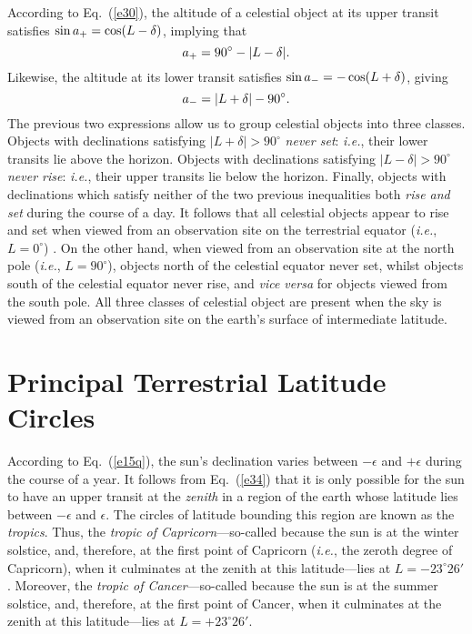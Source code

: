 According to Eq.~(\ref{e30}), the altitude of a celestial object at its upper
transit satisfies $\sin a_{\rm +} = \cos (L-\delta)$, implying that
\begin{equation}\label{e34}
a_{\rm +} = 90^\circ - |L-\delta|.
\end{equation}
Likewise, the altitude at its lower transit satisfies
$\sin a_{\rm -} =- \cos (L+\delta)$, giving
\begin{equation}\label{e35}
a_{\rm -} = |L+\delta| - 90^\circ.
\end{equation}
The previous two expressions allow us to group celestial objects into
three classes. Objects with declinations
satisfying $|L+\delta|> 90^\circ$ {\em never set}: {\em i.e.}, their
lower transits lie above the horizon. Objects with declinations
satisfying $|L-\delta|>90^\circ$ {\em never rise}: {\em i.e.},
their upper transits lie below the horizon. Finally, objects with
declinations which satisfy neither of the two previous inequalities
both {\em rise and set}\/ during the course of a day. It follows that all celestial objects appear to rise and set  when viewed from an observation  site on the
terrestrial equator ({\em i.e.}, $L=0^\circ$) . On the other hand, when viewed from an observation site at the north pole ({\em i.e.}, $L=90^\circ$),
objects north of the celestial equator never set, whilst objects south of the
celestial equator never rise, and {\em vice versa}\/ for objects viewed from the south pole.  All three classes of
celestial object are present when the sky is viewed  from an observation site on the earth's surface of intermediate latitude.

\section{Principal Terrestrial Latitude Circles}
According to Eq.~(\ref{e15q}),  the sun's
declination varies between $-\epsilon$ and $+\epsilon$ during the course of
a year. 
It follows from Eq.~(\ref{e34}) that it is only possible for the  sun to have an
upper transit at the
{\em zenith}\/ in a region of the earth whose
latitude lies between $-\epsilon$
and $\epsilon$. The  circles of latitude bounding this region are known
as the {\em tropics}. Thus, the {\em tropic of Capricorn}---so-called
because the sun is at the winter solstice, and, therefore, at the
first point of Capricorn ({\em i.e.}, the zeroth degree of Capricorn), when  it culminates at the
zenith at this latitude---lies at  $L=-23^\circ 26'$. Moreover,
the {\em tropic of Cancer}---so-called
because the sun is at the summer solstice, and, therefore, at the
first point of Cancer, when  it culminates at the
zenith at this latitude---lies at $L=+23^\circ 26'$. 

